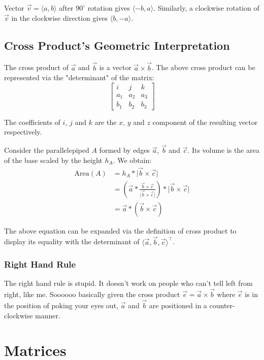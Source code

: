 \documentclass[12pt]{article}
\newcommand{\mo}[1]{\lvert #1 \rvert}
\newcommand{\iv}[1]{\langle #1 \rangle}
\theoremstyle{definition}
\begin{document}
	Vector $\vec{v} = \iv{a, b}$ after $90^\circ$ rotation gives $\iv{-b, a}$. Similarly, a clockwise rotation of $\vec{v}$ in the clockwise direction gives $\iv{b, -a}$.
	
	\subsection{Cross Product's Geometric Interpretation}
	
	The cross product of $\vec{a}$ and $\vec{b}$ is a vector $\vec{a} \times \vec{b}$. The above cross product can be represented via the "determinant" of the matrix:
	\begin{equation*}
	\begin{bmatrix}
		i & j & k \\ a_1 & a_2 & a_3 \\ b_1 & b_2 & b_3
	\end{bmatrix}
	\end{equation*}
	
	The coefficients of $i$, $j$ and $k$ are the $x$, $y$ and $z$ component of the resulting vector respectively.
	
	Consider the parallelepiped $A$ formed by edges $\vec{a}$, $\vec{b}$ and $\vec{c}$. Its volume is the area of the base scaled by the height $h_A$. We obtain:
	\begin{align*}
		\text{Area}(A) &= h_A * \mo{\vec{b} \times \vec{c}} \\
		&= \left(\vec{a} * \frac{\vec{b} \times \vec{c}}{\mo{\vec{b} \times \vec{c}}}\right) * \mo{\vec{b} \times \vec{c}} \\
		&= \vec{a} * (\vec{b} \times \vec{c})
	\end{align*}
	
	The above equation can be expanded via the definition of cross product to display its equality with the determinant of $\iv{\vec{a}, \vec{b}, \vec{c}}^\top$.
	
	\subsubsection{Right Hand Rule}
	
	The right hand rule is stupid. It doesn't work on people who can't tell left from right, like me. Soooooo basically given the cross product $\vec{e} = \vec{a} \times \vec{b}$ where $\vec{e}$ is in the position of poking your eyes out, $\vec{a}$ and $\vec{b}$ are positioned in a counter-clockwise manner.
	
	\section{Matrices}
	
\end{document}
